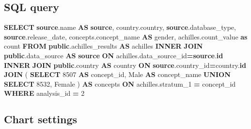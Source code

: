 \documentclass[
]{book}
\newenvironment{Shaded}{\begin{snugshade}}{\end{snugshade}}
\newcommand{\DecValTok}[1]{\textcolor[rgb]{0.00,0.00,0.81}{#1}}
\newcommand{\FunctionTok}[1]{\textcolor[rgb]{0.00,0.00,0.00}{#1}}
\newcommand{\KeywordTok}[1]{\textcolor[rgb]{0.13,0.29,0.53}{\textbf{#1}}}
\newcommand{\NormalTok}[1]{#1}
\newcommand{\OperatorTok}[1]{\textcolor[rgb]{0.81,0.36,0.00}{\textbf{#1}}}
\newcommand{\StringTok}[1]{\textcolor[rgb]{0.31,0.60,0.02}{#1}}
\begin{document}
\hypertarget{sql-query-2}{%
\subsection{SQL query}\label{sql-query-2}}

\begin{Shaded}
\begin{Highlighting}[]
\KeywordTok{SELECT}  \KeywordTok{source}\NormalTok{.name }\KeywordTok{AS} \KeywordTok{source}\NormalTok{,}
\NormalTok{        country.country,}
        \KeywordTok{source}\NormalTok{.database\_type,}
        \KeywordTok{source}\NormalTok{.release\_date,}
\NormalTok{        concepts.concept\_name }\KeywordTok{AS}\NormalTok{ gender,}
\NormalTok{        achilles.count\_value }\KeywordTok{as} \FunctionTok{count}
\KeywordTok{FROM} \KeywordTok{public}\NormalTok{.achilles\_results }\KeywordTok{AS}\NormalTok{ achilles}
\KeywordTok{INNER} \KeywordTok{JOIN} \KeywordTok{public}\NormalTok{.data\_source }\KeywordTok{AS} \KeywordTok{source} \KeywordTok{ON}\NormalTok{ achilles.data\_source\_id}\OperatorTok{=}\KeywordTok{source}\NormalTok{.}\KeywordTok{id}
\KeywordTok{INNER} \KeywordTok{JOIN} \KeywordTok{public}\NormalTok{.country }\KeywordTok{AS}\NormalTok{ country }\KeywordTok{ON} \KeywordTok{source}\NormalTok{.country\_id}\OperatorTok{=}\NormalTok{country.}\KeywordTok{id}
\KeywordTok{JOIN}\NormalTok{ (}
  \KeywordTok{SELECT} \StringTok{\textquotesingle{}8507\textquotesingle{}} \KeywordTok{AS}\NormalTok{ concept\_id, }\StringTok{\textquotesingle{}Male\textquotesingle{}} \KeywordTok{AS}\NormalTok{ concept\_name}
  \KeywordTok{UNION}
  \KeywordTok{SELECT} \StringTok{\textquotesingle{}8532\textquotesingle{}}\NormalTok{, }\StringTok{\textquotesingle{}Female\textquotesingle{}}
\NormalTok{) }\KeywordTok{AS}\NormalTok{ concepts }\KeywordTok{ON}\NormalTok{ achilles.stratum\_1 }\OperatorTok{=}\NormalTok{ concept\_id}
\KeywordTok{WHERE}\NormalTok{ analysis\_id }\OperatorTok{=} \DecValTok{2}
\end{Highlighting}
\end{Shaded}

\hypertarget{chart-settings-2}{%
\subsection{Chart settings}\label{chart-settings-2}}
\end{document}
